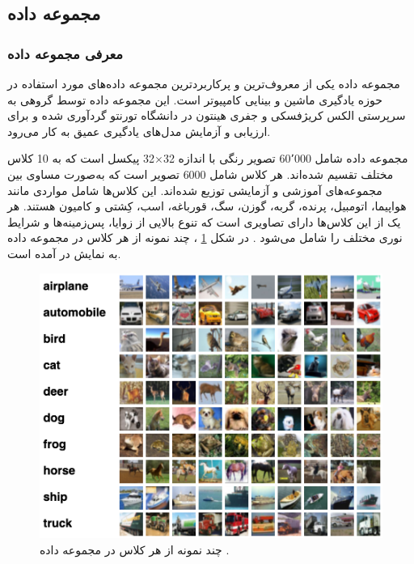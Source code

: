 \subsection{
	مجموعه داده
}

\vspace{3mm}
\subsubsection{
	معرفی مجموعه داده
}\vspace{-1mm}

مجموعه داده
یکی از معروف‌ترین و پرکاربردترین مجموعه داده‌های مورد استفاده در حوزه یادگیری ماشین و بینایی کامپیوتر است. این مجموعه داده توسط گروهی به سرپرستی الکس کریژفسکی%
و جفری هینتون%
در دانشگاه تورنتو گردآوری شده و برای ارزیابی و آزمایش مدل‌های یادگیری عمیق به کار می‌رود.


مجموعه داده
شامل 60٬000 تصویر رنگی با اندازه
32$\times$32
پیکسل است که به 10 کلاس مختلف تقسیم شده‌اند. هر کلاس شامل 6000 تصویر است که به‌صورت مساوی بین مجموعه‌های آموزشی و آزمایشی توزیع شده‌اند. این کلاس‌ها شامل مواردی مانند هواپیما، اتومبیل، پرنده، گربه، گوزن، سگ، قورباغه، اسب، کِشتی و کامیون هستند. هر یک از این کلاس‌ها دارای تصاویری است که تنوع بالایی از زوایا، پس‌زمینه‌ها و شرایط نوری مختلف را شامل می‌شود
\cite{krizhevsky2009learning}.
در شکل
\ref{cifar10}%
، چند نمونه از هر کلاس در مجموعه داده
\mbox{}
به نمایش در آمده است.


\begin{figure}[b!]
	\centering
	\includegraphics[scale=0.7]{images/chap5/cifar10.png}%
	\caption{%
		چند نمونه از هر کلاس در مجموعه داده
		\cite{Evan2022CIFAR10}.
	}
	\label{cifar10}
	\centering
\end{figure}



